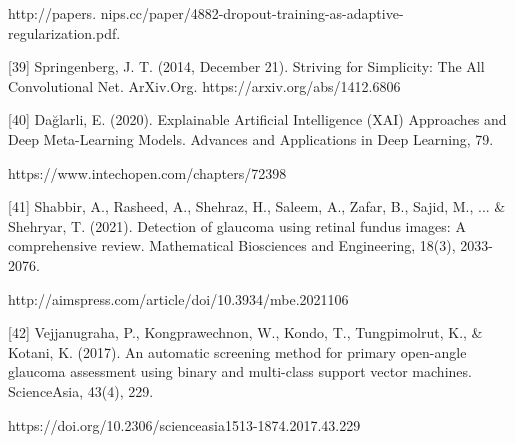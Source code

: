 http://papers. nips.cc/paper/4882-dropout-training-as-adaptive-regularization.pdf.

\vspace{5mm}
[39] Springenberg, J. T. (2014, December 21). Striving for Simplicity: The All Convolutional Net. ArXiv.Org. https://arxiv.org/abs/1412.6806

\vspace{5mm}
[40] Dağlarli, E. (2020). Explainable Artificial Intelligence (XAI) Approaches and Deep Meta-Learning Models. Advances and Applications in Deep Learning, 79. 

https://www.intechopen.com/chapters/72398

\vspace{5mm}
[41] Shabbir, A., Rasheed, A., Shehraz, H., Saleem, A., Zafar, B., Sajid, M., ... & Shehryar, T. (2021). Detection of glaucoma using retinal fundus images: A comprehensive review. Mathematical Biosciences and Engineering, 18(3), 2033-2076. 

http://aimspress.com/article/doi/10.3934/mbe.2021106

\vspace{5mm}
[42] Vejjanugraha, P., Kongprawechnon, W., Kondo, T., Tungpimolrut, K., & Kotani, K. (2017). An automatic screening method for primary open-angle glaucoma assessment using binary and multi-class support vector machines. ScienceAsia, 43(4), 229. 

https://doi.org/10.2306/scienceasia1513-1874.2017.43.229